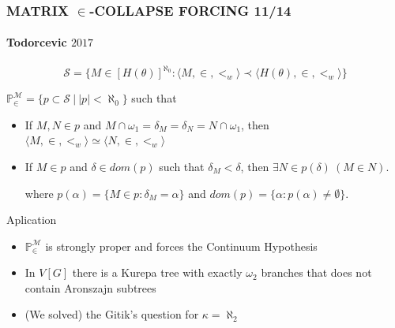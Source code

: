 \documentclass{beamer}
\begin{document}
\begin{frame}
\frametitle{MATRIX $\in$-COLLAPSE FORCING \hspace{29mm}11/14}
\framesubtitle{Todorcevic $2017$}
\vspace{-5mm}
$$\mathcal{S}= \{M \in [H(\theta)]^{\aleph_0} : \langle M, \in, <_w \rangle \prec \langle H(\theta), \in, <_w \rangle \}$$
\vspace{-6mm}
\begin{block}{}
$\mathbb{P}_{\in}^{\mathcal{M}}= \{p \subset \mathcal{S} \ | \ |p| < \aleph_0 \}$ such that
\begin{itemize}
\item If $M, N \in p$ and $M \cap \omega_1 = \delta_M = \delta_N = N \cap \omega_1$, then $\langle M, \in, <_w \rangle \simeq \langle N, \in, <_w \rangle$
\item If $M \in p$ and $\delta \in dom(p)$ such that $\delta_M < \delta$, then $ \exists N \in p(\delta) \ (M \in N)$.

where $p(\alpha)=\{ M \in p : \delta_M=\alpha\}$ and $dom(p)= \{\alpha: p(\alpha) \neq \emptyset\}$.
\end{itemize}
\end{block}
\pause
\vspace{-2mm}
\begin{block}{Aplication}
\begin{itemize}
\item $\mathbb{P}_{\in}^{\mathcal{M}}$ is strongly proper and forces the Continuum Hypothesis
\item In $V[G]$ there is a Kurepa tree with exactly $\omega_2$ branches that does not contain Aronszajn subtrees
\item (We solved) the Gitik's question for $\kappa = \aleph_2$
\end{itemize}
\end{block}
\end{frame}
\end{document}

